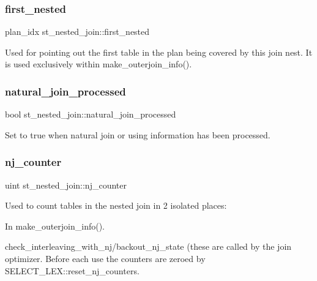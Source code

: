 \subsubsection{\texorpdfstring{first\+\_\+nested}{first\_nested}}
{\footnotesize\ttfamily plan\+\_\+idx st\+\_\+nested\+\_\+join\+::first\+\_\+nested}

Used for pointing out the first table in the plan being covered by this join nest. It is used exclusively within make\+\_\+outerjoin\+\_\+info(). \mbox{\label{structst__nested__join_a5af07228b6a1ebf3b5bd2d7111783fab}} 
\subsubsection{\texorpdfstring{natural\+\_\+join\+\_\+processed}{natural\_join\_processed}}
{\footnotesize\ttfamily bool st\+\_\+nested\+\_\+join\+::natural\+\_\+join\+\_\+processed}

Set to true when natural join or using information has been processed. \mbox{\label{structst__nested__join_a361b5386d86e7de51ef7241de0de3fd3}} 
\subsubsection{\texorpdfstring{nj\+\_\+counter}{nj\_counter}}
{\footnotesize\ttfamily uint st\+\_\+nested\+\_\+join\+::nj\+\_\+counter}

Used to count tables in the nested join in 2 isolated places\+:
\begin{DoxyEnumerate}
\item In make\+\_\+outerjoin\+\_\+info().
\item check\+\_\+interleaving\+\_\+with\+\_\+nj/backout\+\_\+nj\+\_\+state (these are called by the join optimizer. Before each use the counters are zeroed by S\+E\+L\+E\+C\+T\+\_\+\+L\+E\+X\+::reset\+\_\+nj\+\_\+counters. 
\end{DoxyEnumerate}\mbox{\label{structst__nested__join_a46f1da529bd60920ec39ab4082cade2e}} 
